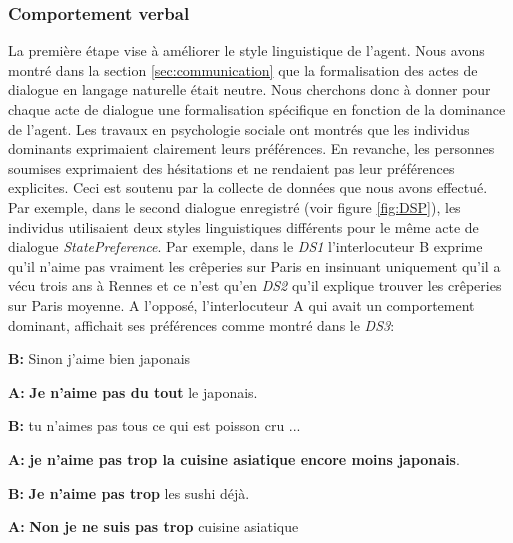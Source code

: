 		\subsubsection{Comportement verbal}
		La première étape vise à améliorer le style linguistique de l'agent. Nous avons montré dans la section \ref{sec:communication} que la formalisation des actes de dialogue en langage naturelle était neutre. 
		Nous cherchons donc à donner pour chaque acte de dialogue une formalisation spécifique en fonction de la dominance de l'agent. Les travaux en psychologie sociale ont montrés que les individus dominants exprimaient clairement leurs préférences. En revanche, les personnes soumises exprimaient des hésitations et ne rendaient pas leur préférences explicites.  Ceci est soutenu par la collecte de données que nous avons effectué.
		Par exemple, dans le second dialogue enregistré (voir figure \ref{fig:DSP}), les individus utilisaient deux styles linguistiques différents pour le même acte de dialogue \emph{StatePreference}. Par exemple, dans le \emph{DS1} l'interlocuteur B exprime qu'il n'aime pas vraiment les crêperies sur Paris en insinuant uniquement qu'il a vécu trois ans à Rennes et ce n'est qu'en \emph{DS2} qu'il explique trouver les crêperies sur Paris moyenne.
		A l'opposé, l'interlocuteur A qui avait un comportement dominant, affichait ses préférences comme montré dans le \emph{DS3}:
	
			\begin{minipage}{\textwidth}
				{\ttfamily
		
					\begin{addmargin}[1em]{2em}%
						
						\vspace{0.5em}
					
						
							 \hspace*{3mm} \textbf{B:}  Sinon j'aime bien japonais 
						
						
							\textbf{A:} \textbf{Je n'aime pas du tout} le japonais.
						
							\hspace*{3mm} 	\textbf{B:} tu n'aimes pas tous ce qui est poisson cru ... 
						
							\textbf{A:}  \textbf{je n'aime pas trop la cuisine asiatique encore moins japonais}.
							
							\hspace*{3mm} 	\textbf{B:} \textbf{Je n'aime pas trop }les sushi déjà.
							
							\textbf{A:} \textbf{Non je ne suis pas trop} cuisine asiatique
							\vspace{1.5em}
					\end{addmargin}
				} 
			\end{minipage}

